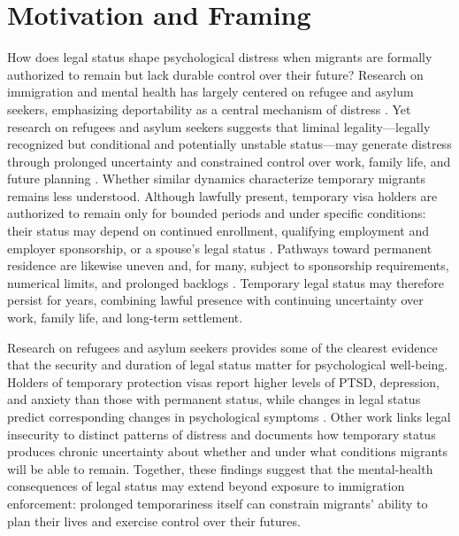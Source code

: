 \documentclass[12pt]{article}
\begin{document}
\section{Motivation and Framing}
How does legal status shape psychological distress when migrants are formally authorized to remain but lack durable control
over their future? Research on immigration and mental health has largely centered on refugee and asylum seekers, emphasizing
deportability as a central mechanism of distress \citep{hamiltonLegalStatusDeportation2023, newnhamMentalHealthEffects2019}.
Yet research on refugees and asylum seekers suggests that liminal legality—legally recognized but conditional and potentially
unstable status—may generate distress through prolonged
uncertainty and constrained control over work, family life, and future planning \citep{menjivarLiminalLegalitySalvadoran2006,
    abregoIncompleteInclusionLegal2015, dueItsDamoclesSword2026}. Whether similar dynamics characterize temporary migrants remains less understood.
Although lawfully present, temporary
visa holders are authorized to remain only for bounded periods and under specific conditions: their status may depend on
continued enrollment, qualifying employment and employer sponsorship, or a spouse's legal status \citep{StudentsEmploymentUSCIS2025, WorkingUnitedStates2025}.
Pathways toward permanent
residence are likewise uneven and, for many, subject to sponsorship requirements, numerical limits, and prolonged backlogs \citep{USCISFilingTrends, H1BCapSeason2026, jacobsPathwaysPermanenceLegal2019}.
Temporary legal status may therefore persist for years, combining lawful presence with continuing uncertainty over work,
family life, and long-term settlement.


Research on refugees and asylum seekers provides some of the clearest evidence that the security and duration of legal
status matter for psychological well-being. Holders of temporary protection visas report higher levels of PTSD, depression,
and anxiety than those with permanent status, while changes in legal status predict corresponding changes in psychological
symptoms \citep{nickersonChangeVisaStatus2011, momartinComparisonMentalHealth2006}.
Other work links legal insecurity to distinct patterns of distress and documents how temporary status produces
chronic uncertainty about whether and under what conditions migrants will be able to remain. Together, these findings
suggest that the mental-health consequences of legal status may extend beyond exposure to immigration enforcement:
prolonged temporariness itself can constrain migrants' ability to plan their lives and exercise control over their futures.
\end{document}
